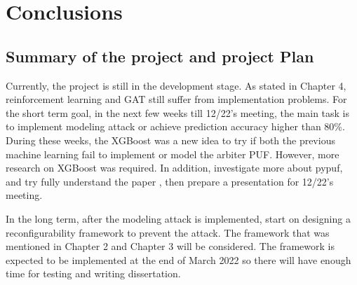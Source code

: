 \chapter{Conclusions}

\section{Summary of the project and project Plan}
Currently, the project is still in the development stage. As stated in Chapter 4, reinforcement learning and GAT still suffer from implementation problems. For the short term goal, in the next few weeks till 12/22's meeting,
the main task is to implement modeling attack or achieve prediction accuracy higher than 80\%. During these weeks, the XGBoost was a new idea to try if both the previous machine learning fail to implement or model the arbiter PUF. 
However, more research on XGBoost was required. In addition, investigate more about pypuf, and try fully understand the paper \cite{Reference11}, then prepare a presentation for 12/22's meeting.


In the long term, after the modeling attack is implemented, start on designing a reconfigurability framework to prevent the attack. The framework that was mentioned in Chapter 2 and Chapter 3 will be considered. The framework
is expected to be implemented at the end of March 2022 so there will have enough time for testing and writing dissertation.
